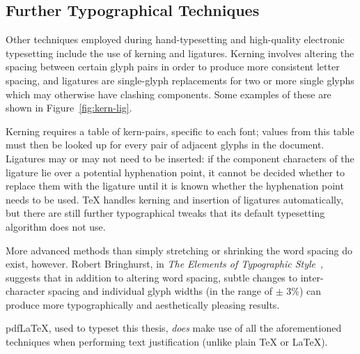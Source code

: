 \subsection{Further Typographical Techniques}
Other techniques employed during hand-type\-set\-t\-ing and high-qua\-l\-ity electronic typesetting include the use of kerning and ligatures. Kerning involves altering the spacing between certain glyph pairs in order to produce more consistent letter spacing, and ligatures are sin\-gle-glyph replacements for two or more single glyphs which may otherwise have clashing components. Some examples of these are shown in Figure~\ref{fig:kern-lig}.

Kerning requires a table of kern-pairs, specific to each font; values from this table must then be looked up for every pair of adjacent glyphs in the document. Ligatures may or may not need to be inserted: if the component characters of the ligature lie over a potential hyphenation point, it cannot be decided whether to replace them with the ligature until it is known whether the hyphenation point needs to be used. \TeX{} handles kerning and insertion of ligatures automatically, but there are still further typographical tweaks that its default typesetting algorithm does not use.

More advanced methods than simply stretching or shrinking the word spacing do exist, however. Robert Bringhurst, in \emph{The Elements of Typographic Style}~\cite{Bringhurst2008}, suggests that in addition to altering word spacing, subtle changes to inter-character spacing and individual glyph widths (in the range of $\pm$ 3\%) can produce more typographically and aesthetically pleasing results.

pdf\LaTeX, used to typeset this thesis, \emph{does} make use of all the aforementioned techniques when performing text justification (unlike plain \TeX{} or \LaTeX{}).
 

